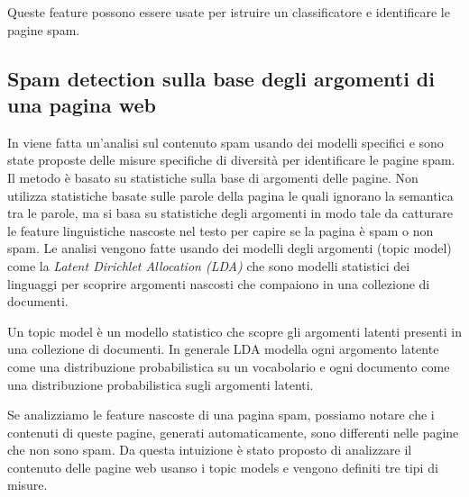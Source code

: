 Queste feature possono essere usate per istruire un classificatore e identificare le pagine spam.

\subsection{Spam detection sulla base degli argomenti di una pagina web}
In \cite{Dong:2012:EDC:2457524.2457693} viene fatta un'analisi sul contenuto spam usando dei modelli specifici e sono state proposte delle misure specifiche di diversità per identificare le pagine spam. Il metodo  è basato su statistiche sulla base di argomenti delle pagine. Non utilizza statistiche basate sulle parole della pagina le quali ignorano la semantica tra le parole, ma si basa su statistiche degli argomenti in modo tale da catturare le feature linguistiche nascoste nel testo per capire se la pagina è spam o non spam. Le analisi vengono fatte usando dei modelli degli argomenti (topic model) come la \textit{Latent Dirichlet Allocation (LDA)} che sono modelli statistici dei linguaggi per scoprire argomenti nascosti che compaiono in una collezione di documenti.

Un topic model è un modello statistico che scopre gli argomenti latenti presenti in una collezione di documenti. In generale LDA modella ogni argomento latente come una distribuzione probabilistica su un vocabolario e ogni documento come una distribuzione probabilistica sugli argomenti latenti.

Se analizziamo le feature nascoste di una pagina spam, possiamo notare che i contenuti di queste pagine, generati automaticamente, sono differenti nelle pagine che non sono spam. Da questa intuizione è stato proposto  di analizzare il contenuto delle pagine web usanso i topic models e vengono definiti tre tipi di misure.

